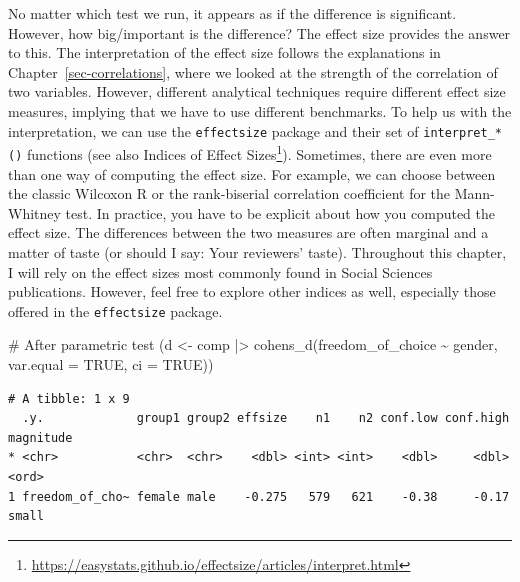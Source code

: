 \documentclass[
  letterpaper,
]{krantz}
\makeatletter
\newenvironment{Shaded}{\begin{snugshade}}{\end{snugshade}}
\newcommand{\AttributeTok}[1]{\textcolor[rgb]{0.40,0.45,0.13}{#1}}
\newcommand{\CommentTok}[1]{\textcolor[rgb]{0.37,0.37,0.37}{#1}}
\newcommand{\ConstantTok}[1]{\textcolor[rgb]{0.56,0.35,0.01}{#1}}
\newcommand{\FunctionTok}[1]{\textcolor[rgb]{0.28,0.35,0.67}{#1}}
\newcommand{\NormalTok}[1]{\textcolor[rgb]{0.00,0.23,0.31}{#1}}
\newcommand{\OtherTok}[1]{\textcolor[rgb]{0.00,0.23,0.31}{#1}}
\newcommand{\SpecialCharTok}[1]{\textcolor[rgb]{0.37,0.37,0.37}{#1}}
\renewcommand{\href}[2]{#2\footnote{\url{#1}}}
\newenvironment{kframe}{%
\medskip{}
\setlength{\fboxsep}{.8em}
 \def\at@end@of@kframe{}%
 \ifinner\ifhmode%
  \def\at@end@of@kframe{\end{minipage}}%
  \begin{minipage}{\columnwidth}%
 \fi\fi%
 \def\FrameCommand##1{\hskip\@totalleftmargin \hskip-\fboxsep
 \colorbox{shadecolor}{##1}\hskip-\fboxsep
     \hskip-\linewidth \hskip-\@totalleftmargin \hskip\columnwidth}%
 \MakeFramed {\advance\hsize-\width
   \@totalleftmargin\z@ \linewidth\hsize
   \@setminipage}}%
 {\par\unskip\endMakeFramed%
 \at@end@of@kframe}
\renewenvironment{Shaded}{\begin{kframe}}{\end{kframe}}
\makeatother
\begin{document}
No matter which test we run, it appears as if the difference is
significant. However, how big/important is the difference? The effect
size provides the answer to this. The interpretation of the effect size
follows the explanations in Chapter~\ref{sec-correlations}, where we
looked at the strength of the correlation of two variables. However,
different analytical techniques require different effect size measures,
implying that we have to use different benchmarks. To help us with the
interpretation, we can use the \texttt{effectsize} package and their set
of \texttt{interpret\_*()} functions (see also
\href{https://easystats.github.io/effectsize/articles/interpret.html}{Indices
of Effect Sizes}). Sometimes, there are even more than one way of
computing the effect size. For example, we can choose between the
classic Wilcoxon R or the rank-biserial correlation coefficient for the
Mann-Whitney test. In practice, you have to be explicit about how you
computed the effect size. The differences between the two measures are
often marginal and a matter of taste (or should I say: Your reviewers'
taste). Throughout this chapter, I will rely on the effect sizes most
commonly found in Social Sciences publications. However, feel free to
explore other indices as well, especially those offered in the
\texttt{effectsize} package.

\begin{Shaded}
\begin{Highlighting}[]
\CommentTok{\# After parametric test}
\NormalTok{(d }\OtherTok{\textless{}{-}}
\NormalTok{    comp }\SpecialCharTok{|\textgreater{}}
    \FunctionTok{cohens\_d}\NormalTok{(freedom\_of\_choice }\SpecialCharTok{\textasciitilde{}}\NormalTok{ gender,}
             \AttributeTok{var.equal =} \ConstantTok{TRUE}\NormalTok{,}
             \AttributeTok{ci =} \ConstantTok{TRUE}\NormalTok{))}
\end{Highlighting}
\end{Shaded}

\begin{verbatim}
# A tibble: 1 x 9
  .y.             group1 group2 effsize    n1    n2 conf.low conf.high magnitude
* <chr>           <chr>  <chr>    <dbl> <int> <int>    <dbl>     <dbl> <ord>    
1 freedom_of_cho~ female male    -0.275   579   621    -0.38     -0.17 small    
\end{verbatim}

\begin{Shaded}
\end{Shaded}
\end{document}
